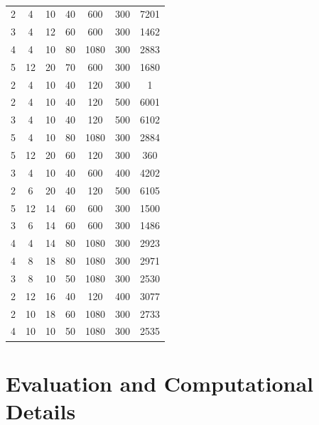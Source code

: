 \documentclass[a4paper]{article}
\begin{document}
\begin{table}
\begin{tabular}{ccccccc}
2	&4	&10	&40	&600	&300	&7201	\\
3	&4	&12	&60	&600	&300	&1462	\\
4	&4	&10	&80	&1080	&300	&2883	\\
5	&12	&20	&70	&600	&300	&1680	\\
		\hline
2	&4	&10	&40	&120	&300	&1	\\
2	&4	&10	&40	&120	&500	&6001	\\
3	&4	&10	&40	&120	&500	&6102	\\
5	&4	&10	&80	&1080	&300	&2884	\\
5	&12	&20	&60	&120	&300	&360	\\
		\hline
3	&4	&10	&40	&600	&400	&4202	\\
2	&6	&20	&40	&120	&500	&6105	\\
5	&12	&14	&60	&600	&300	&1500	\\
3	&6	&14	&60	&600	&300	&1486	\\
4	&4	&14	&80	&1080	&300	&2923	\\
		\hline
4	&8	&18	&80	&1080	&300	&2971	\\
3	&8	&10	&50	&1080	&300	&2530	\\
2	&12	&16	&40	&120	&400	&3077	\\
2	&10	&18	&60	&1080	&300	&2733	\\
4	&10	&10	&50	&1080	&300	&2535	\\
		\hline
		\hline
	\end{tabular}
	\caption{}
	\label{tab:emma}
\end{table}
\fi


\section{Evaluation and Computational Details}
\end{document}

